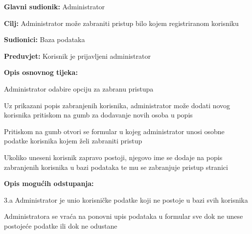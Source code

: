 \documentclass{article}
\begin{document}
		\begin{packed_item}
			
			\item \textbf{Glavni sudionik: }Administrator
			\item  \textbf{Cilj:} Administrator može zabraniti pristup bilo kojem registriranom korisniku 
			\item  \textbf{Sudionici:} Baza podataka
			\item  \textbf{Preduvjet:} Korisnik je prijavljeni administrator
			\item  \textbf{Opis osnovnog tijeka:}
			
			\item[] \begin{packed_enum}
				\item Administrator odabire opciju za zabranu pristupa
				\item Uz prikazani popis zabranjenih korisnika, administrator može dodati novog korisnika pritiskom na gumb za dodavanje novih osoba u popis 
				\item Pritiskom na gumb otvori se formular u kojeg administrator unosi osobne podatke korisnika kojem želi zabraniti pristup 
				\item Ukoliko uneseni korisnik zapravo postoji, njegovo ime se dodaje na popis zabranjenih korisnika u bazi podataka te mu se zabranjuje pristup stranici  
			\end{packed_enum}
			
			\item  \textbf{Opis mogućih odstupanja:}
			
			\item[] \begin{packed_item}
				
				\item[3.a] Administrator je unio korisničke podatke koji ne postoje u bazi svih korisnika 
				\item[] \begin{packed_enum}
					\item Administratora se vraća na ponovni upis podataka u formular sve dok ne unese postojeće podatke ili dok ne odustane 
				\end{packed_enum}
			\end{packed_item}
		\end{packed_item}
	
\end{document}
